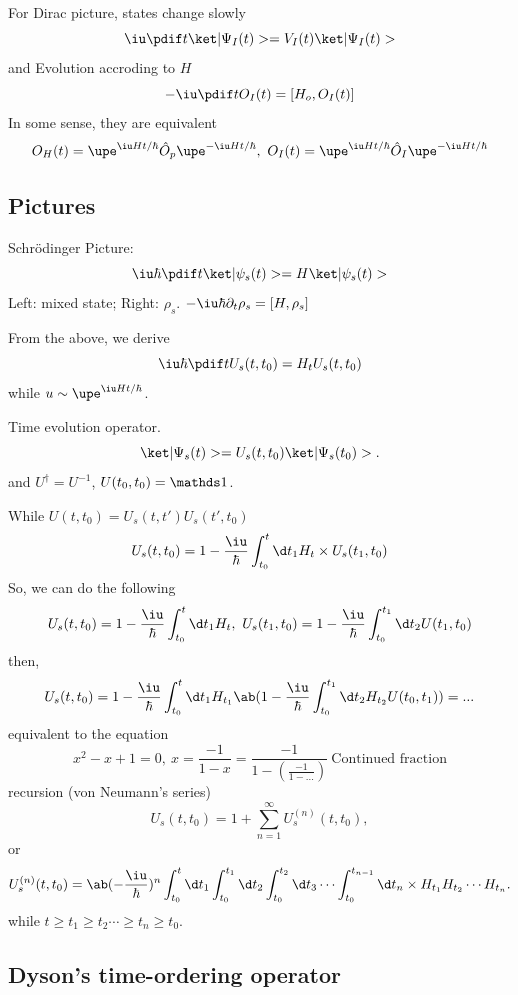 For Dirac picture, states change slowly
\[
  \iu \pdif t \ket|\Psi_I(t)> = V_I(t) \ket|\Psi_I(t)>
\]
and Evolution accroding to $H$
\[
  -\iu \pdif t O_I(t) = [H_o, O_I(t)]
\]
In some sense, they are equivalent
\[
  O_H(t) = \upe^{\iu Ht/\hbar} \hat O_p \upe^{-\iu Ht/\hbar},~
  O_I(t) = \upe^{\iu Ht/\hbar} \hat O_I \upe^{-\iu Ht/\hbar}
\]

\subsection{Pictures}

Schr\"odinger Picture:
\begin{equation}
  \iu \hbar \pdif t \ket|\psi_s(t)> = H \ket|\psi_s(t)>
\end{equation}
Left: mixed state; Right: $\rho_s$.
$-\iu \hbar\partial_t \rho_s = [H, \rho_s]$

From the above, we derive
\[
  \iu\hbar \pdif t U_s(t,t_0) = H_t U_s(t,t_0)
\]
while $u \sim \upe^{\iu Ht/\hbar}$.

Time evolution operator.
\[
  \ket|\Psi_s(t)> = U_s(t,t_0) \ket|\Psi_s(t_0)>.
\]
and $U^\dagger = U^{-1}$, $U(t_0,t_0) = \identity$.

While $U(t,t_0) = U_s(t,t') U_s(t',t_0)$
\[
  U_s(t,t_0) = 1 - \frac\iu\hbar \int_{t_0}^t \d t_1 H_t \times U_s(t_1,t_0)
\]
So, we can do the following
\[
  U_s(t,t_0) = 1 - \frac\iu\hbar \int_{t_0}^t \d t_1 H_t,~
  U_s(t_1,t_0) = 1 - \frac\iu\hbar \int_{t_0}^{t_1} \d t_2 U(t_1,t_0)
\]
then,
\begin{align*}
  U_s(t,t_0) = 1 - \frac\iu\hbar \int_{t_0}^t \d t_1 H_{t_1}
  \ab(1 - \frac\iu\hbar \int_{t_0}^{t_1} \d t_2 H_{t_2} U(t_0,t_1)) = ...
\end{align*}
equivalent to the equation
\[
  x^2 - x + 1 = 0, ~ x = \frac{-1}{1 - x}
= \frac{-1}{1 - (\frac{-1}{1 - ...})} ~ \text{Continued fraction}
\]
recursion (von Neumann's series)
\begin{equation}
  U_s(t,t_0) = 1 + \sum_{n = 1}^\infty U_s^{(n)} (t,t_0),
\end{equation}
or
\[
  U_s^{(n)}(t,t_0) = \ab(-\frac\iu\hbar)^n \int_{t_0}^{t} \d t_1
  \int_{t_0}^{t_1} \d t_2 \int_{t_0}^{t_2} \d t_3 \cdots \int_{t_0}^{t_{n - 1}} \d t_n \times
  H_{t_1} H_{t_2} \cdots H_{t_n}.
\]
while $t \geq t_1 \geq t_2 \cdots \geq t_n \geq t_0$.

\subsection{Dyson's time-ordering operator}

